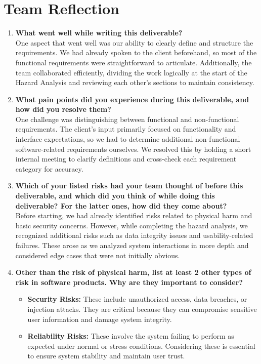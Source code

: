 \documentclass{article}
\begin{document}
\section{Team Reflection}
\begin{enumerate}
    \item \textbf{What went well while writing this deliverable?} \\
    One aspect that went well was our ability to clearly define and structure the requirements. We had already spoken to the client beforehand, so most of the functional requirements were straightforward to articulate. Additionally, the team collaborated efficiently, dividing the work logically at the start of the Hazard Analysis and reviewing each other's sections to maintain consistency.

    \item \textbf{What pain points did you experience during this deliverable, and how did you resolve them?} \\
    One challenge was distinguishing between functional and non-functional requirements. The client's input primarily focused on functionality and interface expectations, so we had to determine additional non-functional software-related requirements ourselves. We resolved this by holding a short internal meeting to clarify definitions and cross-check each requirement category for accuracy.

    \item \textbf{Which of your listed risks had your team thought of before this deliverable, and which did you think of while doing this deliverable? For the latter ones, how did they come about?} \\
    Before starting, we had already identified risks related to physical harm and basic security concerns. However, while completing the hazard analysis, we recognized additional risks such as data integrity issues and usability-related failures. These arose as we analyzed system interactions in more depth and considered edge cases that were not initially obvious.

    \item \textbf{Other than the risk of physical harm, list at least 2 other types of risk in software products. Why are they important to consider?} 
    \begin{itemize}
        \item \textbf{Security Risks:} These include unauthorized access, data breaches, or injection attacks. They are critical because they can compromise sensitive user information and damage system integrity.
        \item \textbf{Reliability Risks:} These involve the system failing to perform as expected under normal or stress conditions. Considering these is essential to ensure system stability and maintain user trust.
    \end{itemize}
\end{enumerate}
\end{document}
